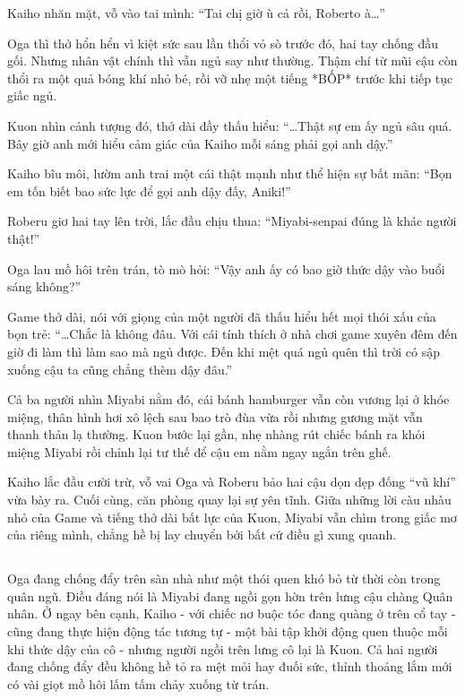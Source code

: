 \documentclass[../main.tex]{subfiles}
\begin{document}
Kaiho nhăn mặt, vỗ vào tai mình: ``Tai chị giờ ù cả rồi, Roberto à\dots''

Oga thì thở hổn hển vì kiệt sức sau lần thổi vỏ sò trước đó, hai tay chống đầu gối. Nhưng nhân vật chính thì vẫn ngủ say như thường. Thậm chí từ mũi cậu còn thổi ra một quả bóng khí nhỏ bé, rồi vỡ nhẹ một tiếng *BỐP* trước khi tiếp tục giấc ngủ.


Kuon nhìn cảnh tượng đó, thở dài đầy thấu hiểu: ``\dots Thật sự em ấy ngủ sâu quá. Bây giờ anh mới hiểu cảm giác của Kaiho mỗi sáng phải gọi anh dậy.''

Kaiho bĩu môi, lườm anh trai một cái thật mạnh như thể hiện sự bất mãn: ``Bọn em tốn biết bao sức lực để gọi anh dậy đấy, Aniki!''

Roberu giơ hai tay lên trời, lắc đầu chịu thua: ``Miyabi-senpai đúng là khác người thật!''

Oga lau mồ hôi trên trán, tò mò hỏi: ``Vậy anh ấy có bao giờ thức dậy vào buổi sáng không?''

Game thở dài, nói với giọng của một người đã thấu hiểu hết mọi thói xấu của bọn trẻ: ``\dots Chắc là không đâu. Với cái tính thích ở nhà chơi game xuyên đêm đến giờ đi làm thì làm sao mà ngủ được. Đến khi mệt quá ngủ quên thì trời có sập xuống cậu ta cũng chẳng thèm dậy đâu.''

Cả ba người nhìn Miyabi nằm đó, cái bánh hamburger vẫn còn vương lại ở khóe miệng, thân hình hơi xô lệch sau bao trò đùa vừa rồi nhưng gương mặt vẫn thanh thản lạ thường. Kuon bước lại gần, nhẹ nhàng rút chiếc bánh ra khỏi miệng Miyabi rồi chỉnh lại tư thế để cậu em nằm ngay ngắn trên ghế.

Kaiho lắc đầu cười trừ, vỗ vai Oga và Roberu bảo hai cậu dọn dẹp đống ``vũ khí'' vừa bày ra. Cuối cùng, căn phòng quay lại sự yên tĩnh. Giữa những lời càu nhàu nhỏ của Game và tiếng thở dài bất lực của Kuon, Miyabi vẫn chìm trong giấc mơ của riêng mình, chẳng hề bị lay chuyển bởi bất cứ điều gì xung quanh.

\newpage

\subsection*{\label{ep-M8.III}}
\vspace{-4pt}

Oga đang chống đẩy trên sàn nhà như một thói quen khó bỏ từ thời còn trong quân ngũ. Điều đáng nói là Miyabi đang ngồi gọn hờn trên lưng cậu chàng Quân nhân. Ở ngay bên cạnh, Kaiho - với chiếc nơ buộc tóc đang quàng ở trên cổ tay - cũng đang thực hiện động tác tương tự - một bài tập khởi động quen thuộc mỗi khi thức dậy của cô - nhưng người ngồi trên lưng cô lại là Kuon. Cả hai người đang chống đẩy đều không hề tỏ ra mệt mỏi hay đuối sức, thỉnh thoảng lắm mới có vài giọt mồ hôi lấm tấm chảy xuống từ trán.
\end{document}
